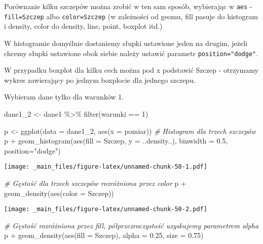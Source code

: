 \documentclass[
]{book}
\newenvironment{Shaded}{\begin{snugshade}}{\end{snugshade}}
\newcommand{\AttributeTok}[1]{\textcolor[rgb]{0.77,0.63,0.00}{#1}}
\newcommand{\CommentTok}[1]{\textcolor[rgb]{0.56,0.35,0.01}{\textit{#1}}}
\newcommand{\DecValTok}[1]{\textcolor[rgb]{0.00,0.00,0.81}{#1}}
\newcommand{\FloatTok}[1]{\textcolor[rgb]{0.00,0.00,0.81}{#1}}
\newcommand{\FunctionTok}[1]{\textcolor[rgb]{0.00,0.00,0.00}{#1}}
\newcommand{\NormalTok}[1]{#1}
\newcommand{\OtherTok}[1]{\textcolor[rgb]{0.56,0.35,0.01}{#1}}
\newcommand{\SpecialCharTok}[1]{\textcolor[rgb]{0.00,0.00,0.00}{#1}}
\newcommand{\StringTok}[1]{\textcolor[rgb]{0.31,0.60,0.02}{#1}}
\begin{document}
Porównanie kilku szczepów można zrobić w ten sam sposób, wybierając w \texttt{aes} - \texttt{fill=Szczep} albo \texttt{color=Szczep} (w zależności od geomu, fill pasuje do histogram i density, color do density, line, point, boxplot itd.)

W histogramie domyślnie dostaniemy słupki ustawione jeden na drugim, jeżeli chcemy słupki ustawione obok siebie należy ustawić parametr \texttt{position="dodge"}.

W przypadku boxplot dla kilku cech można pod x podstawić Szczep - otrzymamy wykres zawierający po jednym boxplocie dla jednego szczepu.

Wybieram dane tylko dla warunków 1.

\begin{Shaded}
\begin{Highlighting}[]
\NormalTok{dane1\_2 }\OtherTok{\textless{}{-}}\NormalTok{ dane1 }\SpecialCharTok{\%\textgreater{}\%} \FunctionTok{filter}\NormalTok{(warunki }\SpecialCharTok{==} \DecValTok{1}\NormalTok{)}

\NormalTok{p }\OtherTok{\textless{}{-}} \FunctionTok{ggplot}\NormalTok{(}\AttributeTok{data =}\NormalTok{ dane1\_2, }\FunctionTok{aes}\NormalTok{(}\AttributeTok{x =}\NormalTok{ pomiar))}
\CommentTok{\# Histogram dla trzech szczepów}
\NormalTok{p }\SpecialCharTok{+} \FunctionTok{geom\_histogram}\NormalTok{(}\FunctionTok{aes}\NormalTok{(}\AttributeTok{fill =}\NormalTok{ Szczep, }\AttributeTok{y =}\NormalTok{ ..density..), }\AttributeTok{binwidth =} \FloatTok{0.5}\NormalTok{, }
                   \AttributeTok{position=}\StringTok{"dodge"}\NormalTok{)}
\end{Highlighting}
\end{Shaded}

\texttt{[image: \_main\_files/figure-latex/unnamed-chunk-50-1.pdf]}

\begin{Shaded}
\begin{Highlighting}[]
\CommentTok{\# Gęstość dla trzech szczepów rozróżniona przez color}
\NormalTok{p }\SpecialCharTok{+} \FunctionTok{geom\_density}\NormalTok{(}\FunctionTok{aes}\NormalTok{(}\AttributeTok{color =}\NormalTok{ Szczep))}
\end{Highlighting}
\end{Shaded}

\texttt{[image: \_main\_files/figure-latex/unnamed-chunk-50-2.pdf]}

\begin{Shaded}
\begin{Highlighting}[]
\CommentTok{\# Gęstość rozróżniona przez fill, półprzezroczystość uzyskujemy parametrem alpha}
\NormalTok{p }\SpecialCharTok{+} \FunctionTok{geom\_density}\NormalTok{(}\FunctionTok{aes}\NormalTok{(}\AttributeTok{fill =}\NormalTok{ Szczep), }\AttributeTok{alpha =} \FloatTok{0.25}\NormalTok{, }\AttributeTok{size =} \FloatTok{0.75}\NormalTok{)}
\end{Highlighting}
\end{Shaded}
\end{document}
